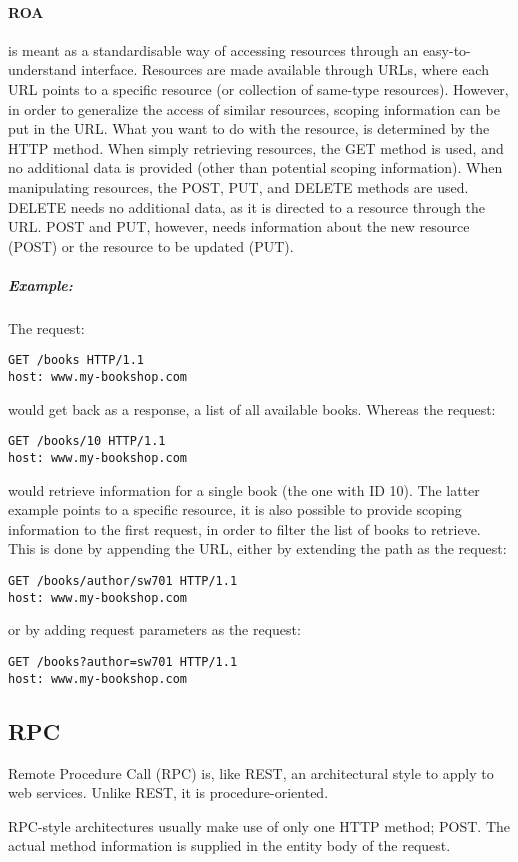 \paragraph{ROA} is meant as a standardisable way of accessing resources through an easy-to-understand interface.
Resources are made available through URLs, where each URL points to a specific resource (or collection of same-type resources).
However, in order to generalize the access of similar resources, scoping information can be put in the URL.
What you want to do with the resource, is determined by the HTTP method.
When simply retrieving resources, the GET method is used, and no additional data is provided (other than potential scoping information).
When manipulating resources, the POST, PUT, and DELETE methods are used.
DELETE needs no additional data, as it is directed to a resource through the URL.
POST and PUT, however, needs information about the new resource (POST) or the resource to be updated (PUT).
\subparagraph{Example:} The request:

\begin{lstlisting}
GET /books HTTP/1.1
host: www.my-bookshop.com
\end{lstlisting}
would get back as a response, a list of all available books.
Whereas the request:
\begin{lstlisting}
GET /books/10 HTTP/1.1
host: www.my-bookshop.com
\end{lstlisting}
would retrieve information for a single book (the one with ID 10).
The latter example points to a specific resource, it is also possible to provide scoping information to the first request, in order to filter the list of books to retrieve.
This is done by appending the URL, either by extending the path as the request:
\begin{lstlisting}
GET /books/author/sw701 HTTP/1.1
host: www.my-bookshop.com
\end{lstlisting}
or by adding request parameters as the request:
\begin{lstlisting}
GET /books?author=sw701 HTTP/1.1
host: www.my-bookshop.com
\end{lstlisting}

\subsection{RPC}
Remote Procedure Call (RPC) is, like REST, an architectural style to apply to web services.
Unlike REST, it is procedure-oriented.

RPC-style architectures usually make use of only one HTTP method; POST.
The actual method information is supplied in the entity body of the request.

